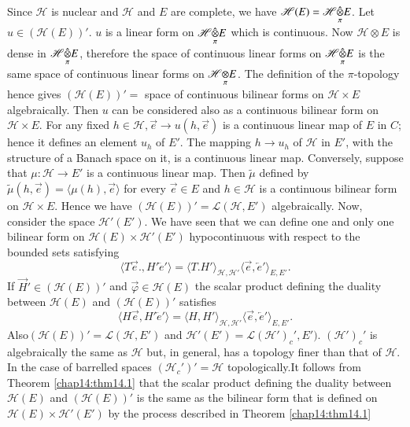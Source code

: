 Since $\mathscr{H}$ is nuclear and $\mathscr{H}$ and $E$ are complete,
we have $\mathscr{H}(E) = \fohprod{\mathscr{H}}{E}{\pi}$.
Let $u \in (\mathscr{H}(E))'$. $u$ is
a linear form on $\fohprod{\mathscr{H}}{E}{\pi}$ which is
continuous. Now $\mathscr{H}\otimes E$ is dense in $\fohprod{\mathscr{H}}
{E}{\pi}$, therefore the space of continuous
linear forms on $\fohprod{\mathscr{H}}{E}{\pi}$ is the
same space of continuous linear forms on $\foprod{\mathscr{H}}
{E}{\pi}$. The definition of the $\pi$-topology hence
gives $(\mathscr{H}(E))' =$ space of continuous bilinear forms on
$\mathscr{H}\times E$ algebraically. Then $u$ can be considered also as
a continuous bilinear form on $\mathscr{H} \times E$. For any fixed $h
\in \mathscr{H}, \overrightarrow{e} \to u(h, \overrightarrow{e})$ is a
continuous linear map of $E$ in $C$; hence it defines an element $u_h$
of $E'$. The mapping $h \to u_h$ of $\mathscr{H}$ in $E'$, with the
structure of a Banach space on it, is a continuous linear
map. Conversely, suppose that $\mu : \mathscr{H} \to E'$ is a
continuous linear map. Then $\tilde{\mu}$ defined by $\tilde{\mu}(h,
\overrightarrow{e}) = \langle \mu(h), \overrightarrow{e} \rangle$ for
every $\overrightarrow{e} \in E$ and $h \in \mathscr{H}$ is a
continuous bilinear form on $\mathscr{H} \times E$. Hence we have
$(\mathscr{H}(E))' = \mathscr{L}(\mathscr{H}, E')$ algebraically. Now,
consider the space $\mathscr{H}'(E')$. We have seen that we can define
one and only one bilinear form on $\mathscr{H}(E) \times
\mathscr{H}'(E')$ hypocontinuous with respect to the bounded sets
satisfying 
$$
\langle T \overrightarrow{e} ., H' \overleftarrow{e}' \rangle =
\langle T. H' \rangle_{\mathscr{H}, \mathscr{H}'} \langle
\overrightarrow{e}, \overleftarrow{e}' \rangle_{E, E'}.
$$
If $\overrightarrow{H}' \in (\mathscr{H}(E))'$ and $\overrightarrow{\varphi} \in
\mathscr{H}(E)$ the scalar product defining the duality between
$\mathscr{H}(E)$ and $(\mathscr{H}(E))'$ satisfies  
$$
\langle H \overrightarrow{e}, H' \overleftarrow{e}' \rangle = \langle
H, H' \rangle_{\mathscr{H}, \mathscr{H}'} \langle \overrightarrow{e},
\overleftarrow{e}' \rangle_{E, E'}.
$$ 
Also\pageoriginale $(\mathscr{H}(E))' = \mathscr{L} (\mathscr{H}, E')$
and $\mathscr{H}'(E') = \mathscr{L}(\mathscr{H}')_c',
E')$. $(\mathscr{H}')_c'$ is algebraically the same as $\mathscr{H}$
but, in general, has a topology finer than that of $\mathscr{H}$. In
the case of barrelled spaces $(\mathscr{H}_c')' = \mathscr{H}$
topologically.It follows from Theorem \ref{chap14:thm14.1} that the
scalar product defining the duality between $\mathscr{H}(E)$ and
$(\mathscr{H}(E))'$ is the same as the bilinear form that is defined
on $\mathscr{H}(E) \times \mathscr{H}'(E')$ by the process described
in Theorem \ref{chap14:thm14.1} 

